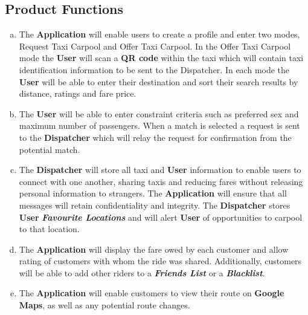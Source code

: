\documentclass[english]{article}
\begin{document}
\subsection{Product Functions}
\label{sub:product_functions}
\begin{enumerate}[a)]
	\item The \textbf{Application} will enable users to create a profile and enter two modes, Request Taxi Carpool and Offer Taxi Carpool. In the Offer Taxi Carpool mode the \textbf{User} will scan a \textbf{QR code} within the taxi which will contain taxi identification information to be sent to the Dispatcher. In each mode the \textbf{User} will be able to enter their destination and sort their search results by distance, ratings and fare price. 
	
	\item The \textbf{User} will be able to enter constraint criteria such as preferred sex and maximum number of passengers. When a match is selected a request is sent to the \textbf{Dispatcher} which will relay the request for confirmation from the potential match. 
	
	\item The \textbf{Dispatcher} will store all taxi and \textbf{User} information to enable users to connect with one another, sharing taxis and reducing fares without releasing personal information to strangers. The \textbf{Application} will ensure that all messages will retain confidentiality and integrity. The \textbf{Dispatcher} stores \textbf{User} \textbf{\emph{Favourite Locations}} and will alert \textbf{User} of opportunities to carpool to that location.
	
	\item The \textbf{Application} will display the fare owed by each customer and allow rating of customers with whom the ride was shared. Additionally, customers will be able to add other riders to a \textbf{\emph{Friends List}} or a \textbf{\emph{Blacklist}}.
	
	\item The \textbf{Application} will enable customers to view their route on \textbf{Google Maps}, as well as any potential route changes.
\end{enumerate}
\end{document}
